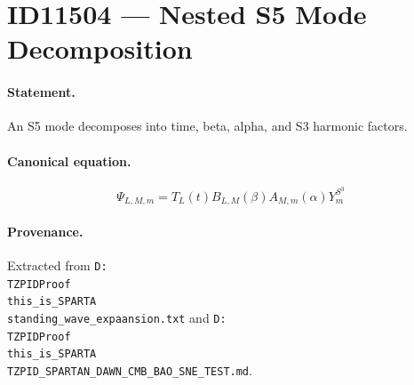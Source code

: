\section*{ID11504 --- Nested S5 Mode Decomposition}

\paragraph{Statement.}
An S5 mode decomposes into time, beta, alpha, and S3 harmonic factors.

\paragraph{Canonical equation.}
\[
\Psi_{L,M,m}=T_L(t)B_{L,M}(\beta)A_{M,m}(\alpha)Y_m^{S^3}
\]

\paragraph{Provenance.}
Extracted from \texttt{D:\\TZPIDProof\\this\_is\_SPARTA\\standing\_wave\_expaansion.txt} and \texttt{D:\\TZPIDProof\\this\_is\_SPARTA\\TZPID\_SPARTAN\_DAWN\_CMB\_BAO\_SNE\_TEST.md}.
